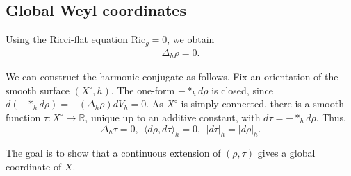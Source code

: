 \documentclass[letterpaper]{amsart}
\theoremstyle{definition}
\theoremstyle{remark}
\begin{document}
\subsection{Global Weyl coordinates}
Using the Ricci-flat equation $\mathrm{Ric}_g = 0$, we obtain
\begin{align*}
	\Delta _h \rho =0.
\end{align*} 

We can construct the harmonic conjugate as follows.
Fix an orientation of the smooth surface $(X^\circ,h)$. The one-form $-*_h d\rho$ is closed, since $d(-*_h d\rho)=-(\Delta_h\rho)dV_h=0$. As $X^\circ$ is simply connected, there is a smooth function $\tau:X^\circ\to\mathbb R$, unique up to an additive constant, with $d\tau=-*_h d\rho$. Thus, 
$$\Delta _{h} \tau =0,\ \ \langle d \rho , d \tau  \rangle_{h} =0,\ \ |d \tau |_{h} = |d \rho |_{h}.$$ 

The goal is to show that a continuous extension of $(\rho , \tau )$ gives a global coordinate of $X$.
\end{document}
